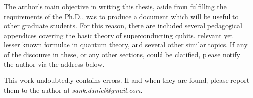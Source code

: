 \begin{noteforthereader}
The author's main objective in writing this thesis, aside from fulfilling the requirements of the Ph.D., was to produce a document which will be useful to other graduate students.
For this reason, there are included several pedagogical appendices covering the basic theory of superconducting qubits, relevant yet lesser known formulae in quantum theory, and several other similar topics.
If any of the discourse in these, or any other sections, could be clarified, please notify the author via the address below.

This work undoubtedly contains errors.
If and when they are found, please report them to the author at \emph{sank.daniel@gmail.com}.
\end{noteforthereader}